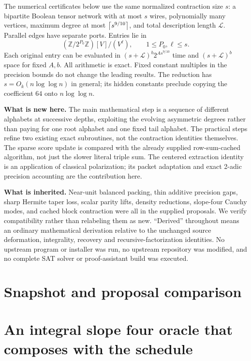 \documentclass[11pt,letterpaper]{article}
\theoremstyle{remark}\newtheorem{remark}[theorem]{Remark}
\begin{document}
The numerical certificates below use the same normalized contraction size $s$: a bipartite Boolean tensor network with at most $s$ wires, polynomially many vertices, maximum degree at most $\left\lceil s^{9/10}\right\rceil$, and total description length $\mathcal L$. Parallel edges have separate ports. Entries lie in
\[
 (\mathbb Z/2^{P_0}\mathbb Z)[V]/(V^\ell),\qquad 1\le P_0,\ell\le s.
\]
Each original entry can be evaluated in $(s+\mathcal L)^b2^{As^{9/10}}$ time and $(s+\mathcal L)^b$ space for fixed $A,b$. All arithmetic is exact. Fixed constant multiples in the precision bounds do not change the leading results. The reduction has $s=O_k(n\log\log n)$ in general; its hidden constants preclude copying the coefficient $64$ onto $n\log\log n$.

\textbf{What is new here.} The main mathematical step is a sequence of different alphabets at successive depths, exploiting the evolving asymmetric degrees rather than paying for one root alphabet and one fixed tail alphabet. The practical steps refine two existing exact subroutines, not the contraction identities themselves. The sparse score update is compared with the already supplied row-sum-cached algorithm, not just the slower literal triple sum. The centered extraction identity is an application of classical polarization; its packet adaptation and exact 2-adic precision accounting are the contribution here.

\textbf{What is inherited.} Near-unit balanced packing, thin additive precision gaps, sharp Hermite taper loss, scalar parity lifts, density reductions, slope-four Cauchy modes, and cached block contraction were all in the supplied proposals. We verify compatibility rather than relabeling them as new. ``Derived'' throughout means an ordinary mathematical derivation relative to the unchanged source deformation, integrality, recovery and recursive-factorization identities. No upstream program or installer was run, no upstream repository was modified, and no complete SAT solver or proof-assistant build was executed.

\section{Snapshot and proposal comparison}\label{sec:comparison}


\section{An integral slope four oracle that composes with the schedule}\label{sec:cauchy}

\end{document}
